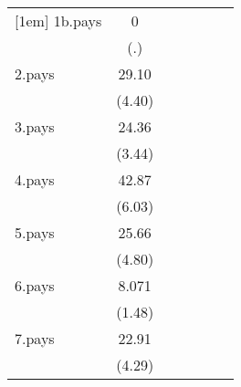 {\begin{tabular}{l*{6}{c}}
[1em]
1b.pays             &           0         &                     &                     &                     &                     &                     \\
                    &         (.)         &                     &                     &                     &                     &                     \\
[1em]
2.pays              &       29.10\sym{***}&                     &                     &                     &                     &                     \\
                    &      (4.40)         &                     &                     &                     &                     &                     \\
[1em]
3.pays              &       24.36\sym{***}&                     &                     &                     &                     &                     \\
                    &      (3.44)         &                     &                     &                     &                     &                     \\
[1em]
4.pays              &       42.87\sym{***}&                     &                     &                     &                     &                     \\
                    &      (6.03)         &                     &                     &                     &                     &                     \\
[1em]
5.pays              &       25.66\sym{***}&                     &                     &                     &                     &                     \\
                    &      (4.80)         &                     &                     &                     &                     &                     \\
[1em]
6.pays              &       8.071         &                     &                     &                     &                     &                     \\
                    &      (1.48)         &                     &                     &                     &                     &                     \\
[1em]
7.pays              &       22.91\sym{***}&                     &                     &                     &                     &                     \\
                    &      (4.29)         &                     &                     &                     &                     &                     \\

\end{tabular}}
